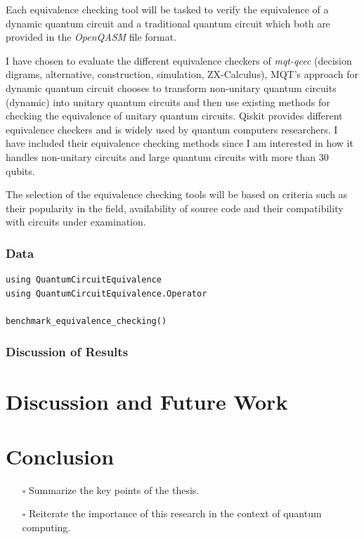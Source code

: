 \documentclass[11pt]{article}
\theoremstyle{definition}
\theoremstyle{definition}
\begin{document}
Each equivalence checking tool will be tasked to verify the equivalence of a dynamic quantum
circuit and a traditional quantum circuit which both are provided in the \emph{OpenQASM} file format.


I have chosen to evaluate  the different equivalence checkers of \emph{mqt-qcec}
 (decision digrams, alternative, construction, simulation, ZX-Calculus),
 MQT's approach for dynamic quantum circuit chooses to transform non-unitary
 quantum circuits (dynamic) into unitary quantum circuits and then use
 existing methods for checking the equivalence of unitary quantum circuits.
 Qiskit provides different equivalence checkers and is widely used by
 quantum computers researchers. I have included their equivalence checking
 methods since I am interested in how it handles non-unitary circuits and
 large quantum circuits with more than 30 qubits.


The selection of the
equivalence checking tools will be based on criteria such as their
popularity in the field, availability of source code and their
compatibility with circuits under examination.


\subsubsection{Data}
\label{sec:org9b10e65}
\begin{verbatim}
using QuantumCircuitEquivalence
using QuantumCircuitEquivalence.Operator

benchmark_equivalence_checking()
\end{verbatim}

\subsubsection{Discussion of Results}
\label{sec:orga2e94b6}
\section{Discussion and Future Work}
\label{sec:org4f581f6}

\section{Conclusion}
\label{sec:orge6e3725}
\begin{itemize}
\item[{$\square$}] Summarize the key points of the thesis.
\item[{$\square$}] Reiterate the importance of this research in the context of quantum computing.
\end{itemize}
\end{document}
